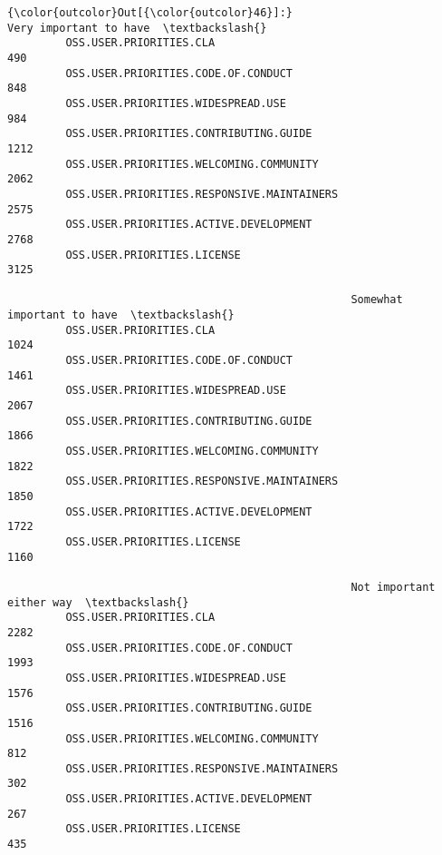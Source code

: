 \documentclass[11pt]{article}
\begin{document}
            \begin{Verbatim}[commandchars=\\\{\}]
{\color{outcolor}Out[{\color{outcolor}46}]:}                                             Very important to have  \textbackslash{}
         OSS.USER.PRIORITIES.CLA                                        490   
         OSS.USER.PRIORITIES.CODE.OF.CONDUCT                            848   
         OSS.USER.PRIORITIES.WIDESPREAD.USE                             984   
         OSS.USER.PRIORITIES.CONTRIBUTING.GUIDE                        1212   
         OSS.USER.PRIORITIES.WELCOMING.COMMUNITY                       2062   
         OSS.USER.PRIORITIES.RESPONSIVE.MAINTAINERS                    2575   
         OSS.USER.PRIORITIES.ACTIVE.DEVELOPMENT                        2768   
         OSS.USER.PRIORITIES.LICENSE                                   3125   
         
                                                     Somewhat important to have  \textbackslash{}
         OSS.USER.PRIORITIES.CLA                                           1024   
         OSS.USER.PRIORITIES.CODE.OF.CONDUCT                               1461   
         OSS.USER.PRIORITIES.WIDESPREAD.USE                                2067   
         OSS.USER.PRIORITIES.CONTRIBUTING.GUIDE                            1866   
         OSS.USER.PRIORITIES.WELCOMING.COMMUNITY                           1822   
         OSS.USER.PRIORITIES.RESPONSIVE.MAINTAINERS                        1850   
         OSS.USER.PRIORITIES.ACTIVE.DEVELOPMENT                            1722   
         OSS.USER.PRIORITIES.LICENSE                                       1160   
         
                                                     Not important either way  \textbackslash{}
         OSS.USER.PRIORITIES.CLA                                         2282   
         OSS.USER.PRIORITIES.CODE.OF.CONDUCT                             1993   
         OSS.USER.PRIORITIES.WIDESPREAD.USE                              1576   
         OSS.USER.PRIORITIES.CONTRIBUTING.GUIDE                          1516   
         OSS.USER.PRIORITIES.WELCOMING.COMMUNITY                          812   
         OSS.USER.PRIORITIES.RESPONSIVE.MAINTAINERS                       302   
         OSS.USER.PRIORITIES.ACTIVE.DEVELOPMENT                           267   
         OSS.USER.PRIORITIES.LICENSE                                      435   
         

\end{Verbatim}
\end{document}
